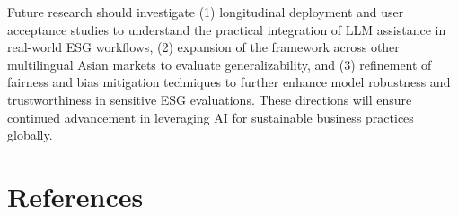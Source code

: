 \documentclass[
  12pt,
]{article}
\begin{document}
Future research should investigate (1) longitudinal deployment and user
acceptance studies to understand the practical integration of LLM
assistance in real-world ESG workflows, (2) expansion of the framework
across other multilingual Asian markets to evaluate generalizability,
and (3) refinement of fairness and bias mitigation techniques to further
enhance model robustness and trustworthiness in sensitive ESG
evaluations. These directions will ensure continued advancement in
leveraging AI for sustainable business practices globally.

\section*{References}\label{references}

\label{refs}
\end{document}
